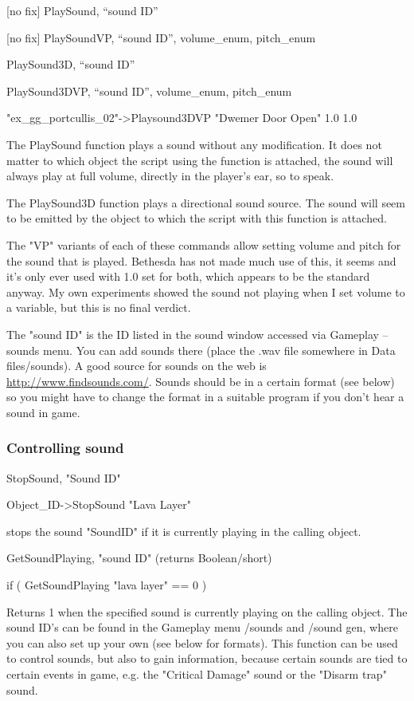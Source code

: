 \documentclass[
]{article}
\begin{document}
{[}no fix{]} PlaySound, ``sound ID''

{[}no fix{]} PlaySoundVP, ``sound ID'', volume\_enum, pitch\_enum

PlaySound3D, ``sound ID''

PlaySound3DVP, ``sound ID'', volume\_enum, pitch\_enum

"ex\_gg\_portcullis\_02"-\textgreater Playsound3DVP "Dwemer Door Open"
1.0 1.0

The PlaySound function plays a sound without any modification. It does
not matter to which object the script using the function is attached,
the sound will always play at full volume, directly in the player's ear,
so to speak.

The PlaySound3D function plays a directional sound source. The sound
will seem to be emitted by the object to which the script with this
function is attached.

The "VP" variants of each of these commands allow setting volume and
pitch for the sound that is played. Bethesda has not made much use of
this, it seems and it's only ever used with 1.0 set for both, which
appears to be the standard anyway. My own experiments showed the sound
not playing when I set volume to a variable, but this is no final
verdict.

The "sound ID" is the ID listed in the sound window accessed via
Gameplay -- sounds menu. You can add sounds there (place the .wav file
somewhere in Data files/sounds). A good source for sounds on the web is
\url{http://www.findsounds.com/}. Sounds should be in a certain format
(see below) so you might have to change the format in a suitable program
if you don't hear a sound in game.

\hypertarget{controlling-sound}{%
\subsubsection{Controlling sound}\label{controlling-sound}}

StopSound, "Sound ID"

Object\_ID-\textgreater StopSound "Lava Layer"

stops the sound "SoundID" if it is currently playing in the calling
object.

GetSoundPlaying, "sound ID" (returns Boolean/short)

if ( GetSoundPlaying "lava layer" == 0 )

Returns 1 when the specified sound is currently playing on the calling
object. The sound ID's can be found in the Gameplay menu /sounds and
/sound gen, where you can also set up your own (see below for formats).
This function can be used to control sounds, but also to gain
information, because certain sounds are tied to certain events in game,
e.g. the "Critical Damage" sound or the "Disarm trap" sound.
\end{document}
